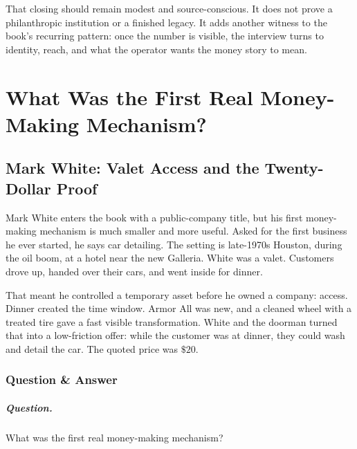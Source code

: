\documentclass[11pt,oneside]{book}
\begin{document}
That closing should remain modest and source-conscious. It does not prove a philanthropic institution or a finished legacy. It adds another witness to the book's recurring pattern: once the number is visible, the interview turns to identity, reach, and what the operator wants the money story to mean.


\chapter{What Was the First Real Money-Making Mechanism?}

\section{Mark White: Valet Access and the Twenty-Dollar Proof}

Mark White enters the book with a public-company title, but his first money-making mechanism is much smaller and more useful. Asked for the first business he ever started, he says car detailing. The setting is late-1970s Houston, during the oil boom, at a hotel near the new Galleria. White was a valet. Customers drove up, handed over their cars, and went inside for dinner.

That meant he controlled a temporary asset before he owned a company: access. Dinner created the time window. Armor All was new, and a cleaned wheel with a treated tire gave a fast visible transformation. White and the doorman turned that into a low-friction offer: while the customer was at dinner, they could wash and detail the car. The quoted price was \(\$20\).

\subsection{Question \& Answer}

\paragraph{Question.}
What was the first real money-making mechanism?
\end{document}
